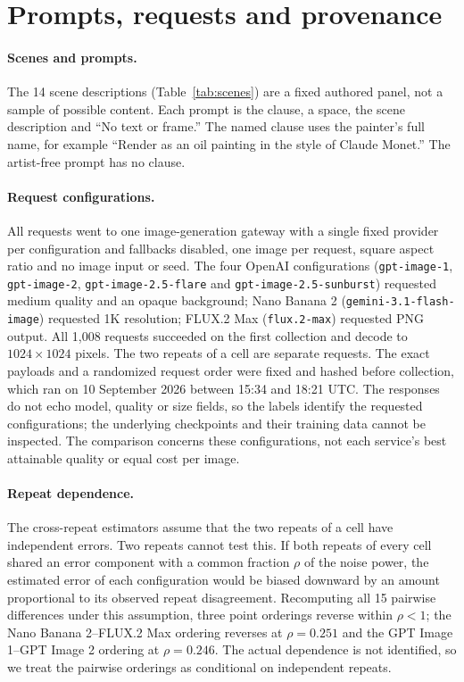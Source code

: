 \section{Prompts, requests and provenance}\label{app:provenance}



\paragraph{Scenes and prompts.}
The 14 scene descriptions (Table~\ref{tab:scenes}) are a fixed authored panel, not a
sample of possible content. Each prompt is the clause, a space, the scene
description and ``No text or frame.'' The named clause uses the painter's full name,
for example ``Render as an oil painting in the style of Claude Monet.'' The
artist-free prompt has no clause.

\paragraph{Request configurations.}
All requests went to one image-generation gateway with a single fixed provider per
configuration and fallbacks disabled, one image per request, square aspect ratio and
no image input or seed. The four OpenAI configurations
(\texttt{gpt-image-1}, \texttt{gpt-image-2}, \texttt{gpt-image-2.5-flare} and
\texttt{gpt-image-2.5-sunburst}) requested medium quality and an opaque background;
Nano Banana 2 (\texttt{gemini-3.1-flash-image}) requested 1K resolution; FLUX.2 Max
(\texttt{flux.2-max}) requested PNG output. All 1,008 requests succeeded on the first
collection and decode to $1024\times1024$ pixels. The two repeats of a cell are
separate requests. The exact payloads and a randomized request order were fixed and
hashed before collection, which ran on 10 September 2026 between 15:34 and 18:21 UTC.
The responses do not echo model, quality or size fields, so the labels identify the
requested configurations; the underlying checkpoints and their training data cannot be
inspected. The comparison concerns these configurations, not each service's best
attainable quality or equal cost per image.

\paragraph{Repeat dependence.}
The cross-repeat estimators assume that the two repeats of a cell have independent
errors. Two repeats cannot test this. If both repeats of every cell shared an error
component with a common fraction $\rho$ of the noise power, the estimated error of
each configuration would be biased downward by an amount proportional to its
observed repeat disagreement. Recomputing all 15 pairwise differences under this
assumption, three point orderings reverse within $\rho<1$; the Nano Banana 2--FLUX.2
Max ordering reverses at $\rho=0.251$ and the GPT Image 1--GPT Image 2 ordering at
$\rho=0.246$. The actual dependence is not identified, so we treat the pairwise
orderings as conditional on independent repeats.

